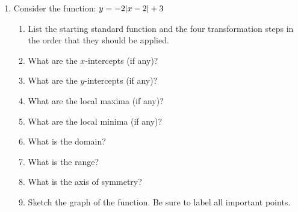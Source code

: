 \documentclass[letterpaper,12pt,fleqn]{article}
\begin{document}
\begin{enumerate}
\item Consider the function: $y=-2\lvert x-2\rvert+3$
  \begin{enumerate}
  \item List the starting standard function and the four transformation steps in the order that they should be
    applied.
  \item What are the $x$-intercepts (if any)?
  \item What are the $y$-intercepts (if any)?
  \item What are the local maxima (if any)?
  \item What are the local minima (if any)?
  \item What is the domain?
  \item What is the range?
  \item What is the axis of symmetry?
  \item Sketch the graph of the function. Be sure to label all important points.
  \end{enumerate}
\end{enumerate}
\end{document}
